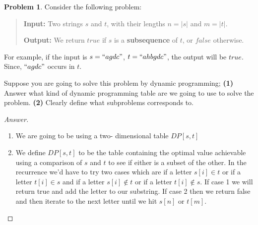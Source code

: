 \documentclass[11pt]{article}
\theoremstyle{definition}
\theoremstyle{definition}
\newtheorem{required}{Problem}
\theoremstyle{definition}
\begin{document}
\setcounter{required}{21}
\begin{required} 
Consider the following problem:
\begin{quotation}
\noindent \textbf{Input: } Two strings $s$ and $t$, with their lengths $n = |s|$ and $m = |t|$.

\noindent \textbf{Output: } We return $true$ if $s$ is a \textbf{subsequence} of $t$, or $false$ otherwise.
\end{quotation}

For example, if the input is $s = ``agdc"$, $t = ``ahbgdc"$, the output will be $true$. Since, $``agdc"$ occurs in $t$.

Suppose you are going to solve this problem by dynamic programming; \textbf{(1)} Answer what kind of dynamic programming table are we going to use to solve the problem. \textbf{(2)} Clearly define what subproblems corresponds to. 

\begin{proof}[Answer]
	\begin{enumerate}
		\item We are going to be using a two- dimensional table $DP[s, t]$
		\item We define $DP[s, t]$ to be the table containing the optimal value achievable using a comparison of $s$ and $t$ to see if either is a subset of the other. In the recurrence we'd have to try two cases which are if a letter $s[i] \in t$ or if a letter $t[i] \in s$ and if a letter $s[i] \not\in t$ or if a letter $t[i] \not\in s$. If case 1 we will return true and add the letter to our substring. If case 2 then we return false and then iterate to the next letter until we hit $s[n]$ or $t[m]$.\\
		
	\end{enumerate}
\end{proof}
\end{required}

\end{document}
